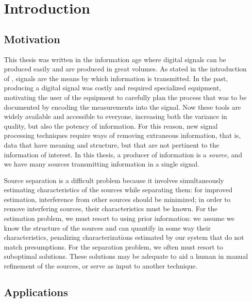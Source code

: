 \chapter{Introduction \label{chap:intro}}

\section{Motivation}

This thesis was written in the information age where digital signals can be
produced easily and are produced in great volumes. As stated in the introduction
of \cite{hayes2009statistical}, signals are the means by which information is
transmitted. In the past, producing a digital signal was costly and required
specialized equipment, motivating the user of the equipment to carefully plan
the process that was to be documented by encoding the measurements into the
signal. Now these tools are widely available and accessible to everyone,
increasing both the variance in quality, but also the potency of information.
For this reason, new signal processing techniques require ways of removing
extraneous information, that is, data that have meaning and structure, but that
are not pertinent to the information of interest. In this thesis, a producer of
information is a \textit{source}, and we have many sources transmitting
information in a single signal. 

Source separation is a difficult problem because it involves simultaneously
estimating characteristics of the sources while separating them: for improved
estimation, interference from other sources should be minimized; in order to
remove interfering sources, their characteristics must be known. For the
estimation problem, we must resort to using prior information: we assume we
know the structure of the sources and can quantify in some way their
characteristics, penalizing characterizations estimated by our system that do
not match presumptions. For the separation problem, we often must resort to
suboptimal solutions. These solutions may be adequate to aid a human in manual
refinement of the sources, or serve as input to another technique.

\section{Applications}

